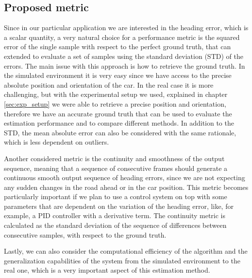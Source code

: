 \documentclass[a4paper,12pt,sort&compress]{article}
\begin{document}
    \subsection{Proposed metric}
    Since in our particular application we are interested in the heading error, which is a scalar
    quantity, a very natural choice for a performance metric is the squared error of the single sample with
    respect to the perfect ground truth, that can extended to evaluate a set of samples using the
    standard deviation (STD) of the errors. The main issue with this approach is how to retrieve the ground
    truth. In the simulated environment it is very easy since we have access to the precise absolute position
    and orientation of the car. In the real case it is more challenging, but with the experimental
    setup we used, explained in chapter \ref{sec:exp_setup} we were able to retrieve a precise
    position and orientation, therefore we have an accurate ground truth that can be used to
    evaluate the estimation performance and to compare different methods. In addition to the STD,
    the mean absolute error can also be considered with the same rationale, which is less dependent
    on outliers. 

    Another considered metric is the continuity and smoothness of the output sequence,
    meaning that a sequence of consecutive frames should generate a continuous smooth output sequence
    of heading errors, since we are not expecting any sudden changes in the road ahead or in the car
    position. This metric becomes particularly important if we plan to use a control system on top
    with some parameters that are dependent on the variation of the heading error, like, for
    example, a PID controller with a derivative term. The continuity metric is calculated as the
    standard deviation of the sequence of differences between consecutive samples, with respect to
    the ground truth.    

    Lastly, we can also consider the computational efficiency of the algorithm and the
    generalization capabilities of the system from the simulated environment to the real one, which
    is a very important aspect of this estimation method.   
\end{document}
